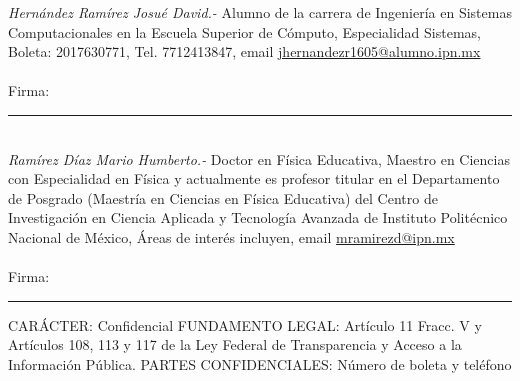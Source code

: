 \documentclass[letterpaper, 10pt]{article}
\def\letra#1#2{%
\tamanyo=#1%
\interlinea=1.2\tamanyo%
\fontfamily{ptm}
\fontsize{\the\tamanyo}%
{\the\interlinea}\selectfont#2}
\begin{document}
\begin{multicols*}{2}
    \textit{Hernández Ramírez Josué David.- }Alumno de la carrera de Ingeniería en Sistemas Computacionales en la Escuela Superior de Cómputo, Especialidad Sistemas, Boleta: 2017630771, Tel. 7712413847, email \url{jhernandezr1605@alumno.ipn.mx}\\\\
    Firma: \rule{7cm}{1pt}
    \vspace{5mm} %
    \\
    \textit{Ramírez Díaz Mario Humberto.- }Doctor en Física Educativa, Maestro en Ciencias con Especialidad en Física y actualmente es profesor titular en el Departamento de Posgrado (Maestría en Ciencias en Física Educativa) del Centro de Investigación en Ciencia Aplicada y Tecnología Avanzada de Instituto Politécnico Nacional de México, Áreas de interés incluyen, email \url{mramirezd@ipn.mx} \\ \\
    
    Firma: \rule{7cm}{1pt}
    \begin{tcolorbox}[colback=black!5!white,colframe=black!5!white,]
        \begin{flushright}
        \letra{8pt}{
            CARÁCTER: Confidencial
            \newline
            FUNDAMENTO LEGAL: Artículo 11 Fracc. V y Artículos
            108, 113 y 117 de la Ley Federal de Transparencia y Acceso
            a la Información Pública.
            \newline
            PARTES CONFIDENCIALES: Número de boleta y teléfono
        }
            
        \end{flushright}
   
    \end{tcolorbox}
    
\end{multicols*}
\end{document}

